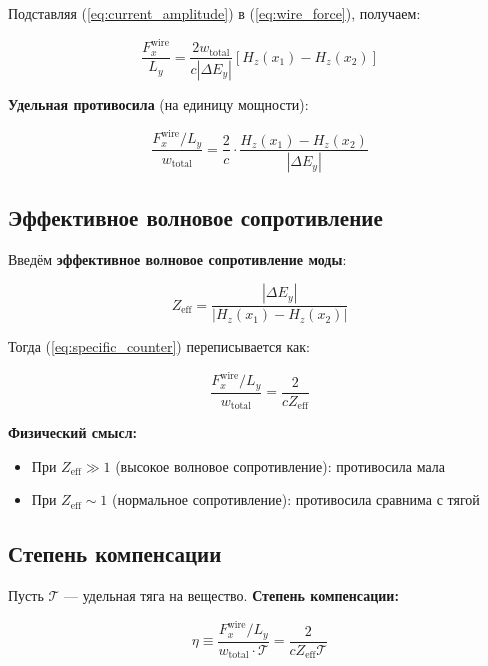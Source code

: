\documentclass[a4paper,12pt]{article}
\begin{document}
Подставляя (\ref{eq:current_amplitude}) в (\ref{eq:wire_force}), получаем:

\begin{equation}
\frac{F_x^{\text{wire}}}{L_y} = \frac{2 w_{\text{total}}}{c |\Delta E_y|} 
\left[ H_z(x_1) - H_z(x_2) \right]
\end{equation}

\textbf{Удельная противосила} (на единицу мощности):

\begin{equation}
\boxed{
\frac{F_x^{\text{wire}}/L_y}{w_{\text{total}}} = \frac{2}{c} \cdot 
\frac{H_z(x_1) - H_z(x_2)}{|\Delta E_y|}
}
\label{eq:specific_counter}
\end{equation}

\subsection{Эффективное волновое сопротивление}

Введём \textbf{эффективное волновое сопротивление моды}:

\begin{equation}
\boxed{
Z_{\text{eff}} = \frac{|\Delta E_y|}{|H_z(x_1) - H_z(x_2)|}
}
\label{eq:Z_eff}
\end{equation}

Тогда (\ref{eq:specific_counter}) переписывается как:

\begin{equation}
\frac{F_x^{\text{wire}}/L_y}{w_{\text{total}}} = \frac{2}{c Z_{\text{eff}}}
\label{eq:specific_counter_Z}
\end{equation}

\textbf{Физический смысл:}
\begin{itemize}
    \item При $Z_{\text{eff}} \gg 1$ (высокое волновое сопротивление): 
    противосила мала
    \item При $Z_{\text{eff}} \sim 1$ (нормальное сопротивление): 
    противосила сравнима с тягой
\end{itemize}

\subsection{Степень компенсации}

Пусть $\mathcal{T}$ --- удельная тяга на вещество. \textbf{Степень компенсации:}

\begin{equation}
\boxed{
\eta \equiv \frac{F_x^{\text{wire}}/L_y}{w_{\text{total}} \cdot \mathcal{T}} 
= \frac{2}{c Z_{\text{eff}} \mathcal{T}}
}
\label{eq:eta}
\end{equation}
\end{document}
